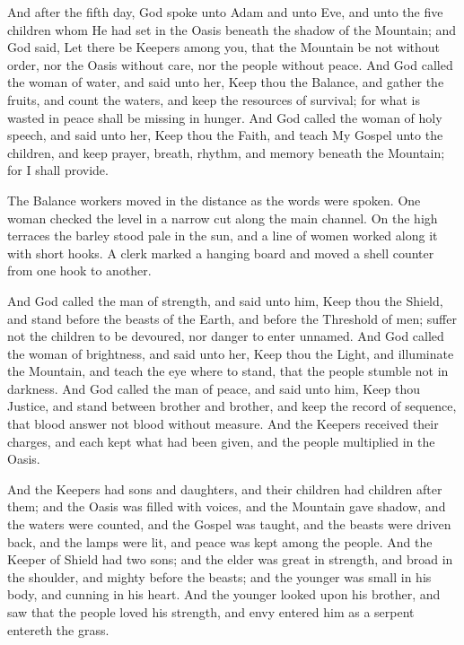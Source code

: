 \begin{scripture}
And after the fifth day, God spoke unto Adam and unto Eve, and unto the five children whom He had set in the Oasis beneath the shadow of the Mountain; and God said, Let there be Keepers among you, that the Mountain be not without order, nor the Oasis without care, nor the people without peace. And God called the woman of water, and said unto her, Keep thou the Balance, and gather the fruits, and count the waters, and keep the resources of survival; for what is wasted in peace shall be missing in hunger. And God called the woman of holy speech, and said unto her, Keep thou the Faith, and teach My Gospel unto the children, and keep prayer, breath, rhythm, and memory beneath the Mountain; for I shall provide.
\end{scripture}

The Balance workers moved in the distance as the words were spoken. One woman checked the level in a narrow cut along the main channel. On the high terraces the barley stood pale in the sun, and a line of women worked along it with short hooks. A clerk marked a hanging board and moved a shell counter from one hook to another. \par

\begin{scripture}
And God called the man of strength, and said unto him, Keep thou the Shield, and stand before the beasts of the Earth, and before the Threshold of men; suffer not the children to be devoured, nor danger to enter unnamed. And God called the woman of brightness, and said unto her, Keep thou the Light, and illuminate the Mountain, and teach the eye where to stand, that the people stumble not in darkness. And God called the man of peace, and said unto him, Keep thou Justice, and stand between brother and brother, and keep the record of sequence, that blood answer not blood without measure. And the Keepers received their charges, and each kept what had been given, and the people multiplied in the Oasis.
\end{scripture}

\begin{scripture}
And the Keepers had sons and daughters, and their children had children after them; and the Oasis was filled with voices, and the Mountain gave shadow, and the waters were counted, and the Gospel was taught, and the beasts were driven back, and the lamps were lit, and peace was kept among the people. And the Keeper of Shield had two sons; and the elder was great in strength, and broad in the shoulder, and mighty before the beasts; and the younger was small in his body, and cunning in his heart. And the younger looked upon his brother, and saw that the people loved his strength, and envy entered him as a serpent entereth the grass.
\end{scripture}

